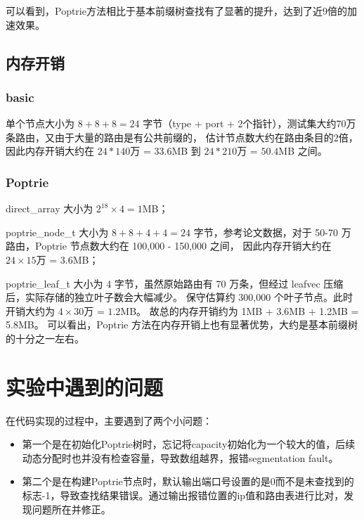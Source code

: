 \documentclass[11pt]{article}
\begin{document}
可以看到，Poptrie方法相比于基本前缀树查找有了显著的提升，达到了近9倍的加速效果。
\subsection{内存开销}
\subsubsection{basic}
单个节点大小为 $8 + 8 + 8 = 24$ 字节（type + port + 2个指针），测试集大约70万条路由，又由于大量的路由是有公共前缀的，
估计节点数大约在路由条目的2倍，因此内存开销大约在 $24 * 140$万 = $33.6$MB 到 $24 * 210$万 = $50.4$MB 之间。
\subsubsection{Poptrie}
direct_array 大小为 $2^{18} \times 4 = 1$MB；

poptrie_node_t 大小为 $8 + 8 + 4 + 4 = 24$ 字节，参考论文数据，对于 50-70 万路由，Poptrie 节点数大约在 100,000 - 150,000 之间，
因此内存开销大约在 $24 \times 15$万 = $3.6$MB；

poptrie_leaf_t 大小为 4 字节，虽然原始路由有 70 万条，但经过 leafvec 压缩后，实际存储的独立叶子数会大幅减少。
保守估算约 300,000 个叶子节点。此时开销大约为 $4 \times 30$万 = $1.2$MB。
故总的内存开销约为 1MB + 3.6MB + 1.2MB = 5.8MB。
可以看出，Poptrie 方法在内存开销上也有显著优势，大约是基本前缀树的十分之一左右。

\section{实验中遇到的问题}

在代码实现的过程中，主要遇到了两个小问题：
\begin{itemize}
	\item 第一个是在初始化Poptrie树时，忘记将capacity初始化为一个较大的值，后续动态分配时也并没有检查容量，导致数组越界，报错segmentation fault。
	\item 第二个是在构建Poptrie节点时，默认输出端口号设置的是0而不是未查找到的标志-1，导致查找结果错误。通过输出报错位置的ip值和路由表进行比对，发现问题所在并修正。
\end{itemize}
\end{document}
